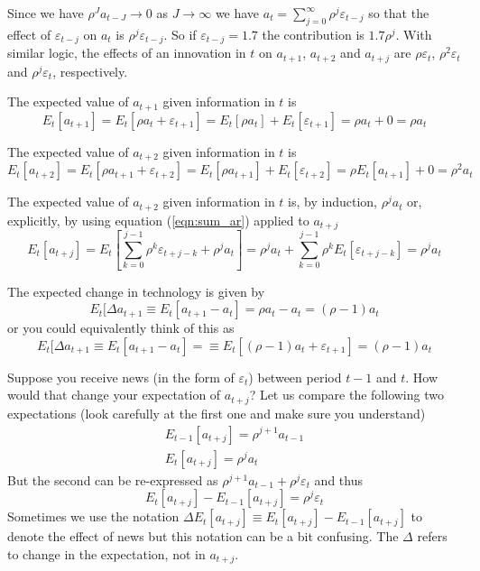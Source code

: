 \documentclass[authoryear,11pt]{elsarticle}
\begin{document}
Since we have $\rho^{J}a_{t-J} \to 0$ as $J \to \infty$ we have $a_{t} = \sum\limits_{j=0}^{\infty} \rho^{j} \varepsilon_{t-j}$ so that the effect of $\varepsilon_{t-j}$ on $a_{t}$ is $\rho^{j} \varepsilon_{t-j}$. So if $\varepsilon_{t-j}=1.7$ the contribution is $1.7\rho^{j}$. With similar logic, the effects of an innovation in $t$ on $a_{t+1}$, $a_{t+2}$ and $a_{t+j}$ are $\rho \varepsilon_{t}$, $\rho^{2} \varepsilon_{t}$ and $\rho^{j} \varepsilon_{t}$, respectively.

The expected value of $a_{t+1}$ given information in $t$ is
\[
E_{t}[a_{t+1}] = E_{t} [ \rho a_{t} + \varepsilon_{t+1} ] = E_{t} [ \rho a_{t} ] + E_{t}[ \varepsilon_{t+1} ] = \rho a_{t}  + 0 = \rho a_{t}
\]

The expected value of $a_{t+2}$ given information in $t$ is
\[
E_{t}[a_{t+2}] = E_{t} [ \rho a_{t+1} + \varepsilon_{t+2} ] = E_{t} [ \rho a_{t+1} ] + E_{t}[ \varepsilon_{t+2} ] = \rho E_{t}[a_{t+1}]  + 0 = \rho^2 a_{t}
\]

The expected value of $a_{t+2}$ given information in $t$ is, by induction, $\rho^{j} a_{t}$ or, explicitly, by using equation (\ref{eqn:sum_ar}) applied to $a_{t+j}$
\[
E_{t}[a_{t+j}] = E_{t}[ \sum\limits_{k=0}^{j-1} \rho^{k} \varepsilon_{t+j-k} + \rho^{j} a_{t} ] = \rho^{j} a_{t} + \sum\limits_{k=0}^{j-1} \rho^{k} E_{t}[\varepsilon_{t+j-k}] =  \rho^{j} a_{t}
\]

The expected change in technology is given by
\[
E_{t}[\Delta a_{t+1} \equiv E_{t}[ a_{t+1} - a_{t}] = \rho a_{t} - a_{t} = (\rho - 1) a_{t}
\]
or you could equivalently think of this as
\[
E_{t}[\Delta a_{t+1} \equiv E_{t}[ a_{t+1} - a_{t}] =  \equiv E_{t}[ (\rho-1) a_{t} + \varepsilon_{t+1}] = (\rho - 1) a_{t}
\]

Suppose you receive news (in the form of $\varepsilon_{t}$) between period $t-1$ and $t$. How would that change your expectation of $a_{t+j}$? Let us compare the following two expectations (look carefully at the first one and make sure you understand)
\begin{eqnarray*}
E_{t-1}[ a_{t+j} ] = \rho^{j+1} a_{t-1}	\\
E_{t} [ a_{t+j} ] = \rho^{j} a_{t}
\end{eqnarray*}
But the second can be re-expressed as $\rho^{j+1} a_{t-1} + \rho^{j} \varepsilon_{t}$ and thus
\[
E_{t} [ a_{t+j} ] - E_{t-1}[ a_{t+j} ] = \rho^{j}  \varepsilon_{t}
\]
Sometimes we use the notation $\Delta E_{t}[ a_{t+j} ] \equiv E_{t} [ a_{t+j} ] - E_{t-1}[ a_{t+j} ]$ to denote the effect of news but this notation can be a bit confusing. The $\Delta$ refers to change in the expectation, not in $a_{t+j}$.
\end{document}
